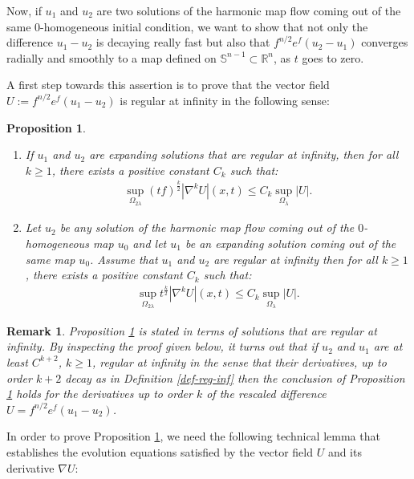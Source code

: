 \documentclass[a4paper,11pt,reqno]{amsart}
\newtheorem{prop}[defn]{Proposition}
\newtheorem{rk}[defn]{Remark}
\begin{document}
 
Now, if $u_1$ and $u_2$ are two solutions of the harmonic map flow coming out of the same $0$-homogeneous initial condition, we want to show that not only the difference $u_1-u_2$ is decaying really fast but also that $f^{n/2}e^f(u_2-u_1)$ converges radially and smoothly to a map defined on $\mathbb{S}^{n-1}\subset \mathbb{R}^n$, as $t$ goes to zero.

A first step towards this assertion is to prove that the vector field $U:=f^{n/2}e^f(u_1-u_2)$ is regular at infinity in the following sense:

\begin{prop}\label{autom-reg-infty}
\begin{enumerate}
\item If $u_1$ and $u_2$ are expanding solutions that are regular at infinity, then for all $k\geq 1$, there exists a positive constant $C_k$ such that:
\begin{eqnarray*}
\sup_{\Omega_{2\lambda}}(tf)^{\frac{k}{2}}|\nabla^kU|(x,t)\leq C_k\sup_{\Omega_{\lambda}}|U|.
\end{eqnarray*}
\item Let $u_2$ be any solution of the harmonic map flow coming out of the $0$-homogeneous map $u_0$ and let $u_1$ be an expanding solution coming out of the same map $u_0$. Assume that $u_1$ and $u_2$ are regular at infinity then for all $k\geq 1$, there exists a positive constant $C_k$ such that:
\begin{eqnarray*}
\sup_{\Omega_{2\lambda}}t^{\frac{k}{2}}|\nabla^kU|(x,t)\leq C_k\sup_{\Omega_{\lambda}}|U|.
\end{eqnarray*}
\end{enumerate}
\end{prop}
\begin{rk}\label{rk-autom-reg}
Proposition \ref{autom-reg-infty} is stated in terms of solutions that are regular at infinity. By inspecting the proof given below, it turns out that if $u_2$ and $u_1$ are at least $C^{k+2}$, $k\geq 1$, regular at infinity in the sense that their derivatives, up to order $k+2$ decay as in Definition \ref{def-reg-inf} then the conclusion of Proposition \ref{autom-reg-infty} holds for the derivatives up to order $k$ of the rescaled difference $U=f^{n/2}e^f(u_1-u_2)$.  
\end{rk}
In order to prove Proposition \ref{autom-reg-infty}, we need the following technical lemma that establishes the evolution equations satisfied by the vector field $U$ and its derivative $\nabla U$:
\end{document}
